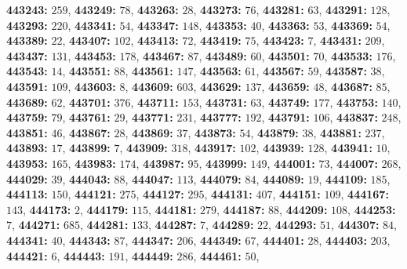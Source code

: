 \textsf{\bfseries 443243:} $259$, \textsf{\bfseries 443249:} $78$, \textsf{\bfseries 443263:} $28$, \textsf{\bfseries 443273:} $76$, \textsf{\bfseries 443281:} $63$, \textsf{\bfseries 443291:} $128$, \textsf{\bfseries 443293:} $220$, \textsf{\bfseries 443341:} $54$, \textsf{\bfseries 443347:} $148$, \textsf{\bfseries 443353:} $40$, \textsf{\bfseries 443363:} $53$, \textsf{\bfseries 443369:} $54$, \textsf{\bfseries 443389:} $22$, \textsf{\bfseries 443407:} $102$, \textsf{\bfseries 443413:} $72$, \textsf{\bfseries 443419:} $75$, \textsf{\bfseries 443423:} $7$, \textsf{\bfseries 443431:} $209$, \textsf{\bfseries 443437:} $131$, \textsf{\bfseries 443453:} $178$, \textsf{\bfseries 443467:} $87$, \textsf{\bfseries 443489:} $60$, \textsf{\bfseries 443501:} $70$, \textsf{\bfseries 443533:} $176$, \textsf{\bfseries 443543:} $14$, \textsf{\bfseries 443551:} $88$, \textsf{\bfseries 443561:} $147$, \textsf{\bfseries 443563:} $61$, \textsf{\bfseries 443567:} $59$, \textsf{\bfseries 443587:} $38$, \textsf{\bfseries 443591:} $109$, \textsf{\bfseries 443603:} $8$, \textsf{\bfseries 443609:} $603$, \textsf{\bfseries 443629:} $137$, \textsf{\bfseries 443659:} $48$, \textsf{\bfseries 443687:} $85$, \textsf{\bfseries 443689:} $62$, \textsf{\bfseries 443701:} $376$, \textsf{\bfseries 443711:} $153$, \textsf{\bfseries 443731:} $63$, \textsf{\bfseries 443749:} $177$, \textsf{\bfseries 443753:} $140$, \textsf{\bfseries 443759:} $79$, \textsf{\bfseries 443761:} $29$, \textsf{\bfseries 443771:} $231$, \textsf{\bfseries 443777:} $192$, \textsf{\bfseries 443791:} $106$, \textsf{\bfseries 443837:} $248$, \textsf{\bfseries 443851:} $46$, \textsf{\bfseries 443867:} $28$, \textsf{\bfseries 443869:} $37$, \textsf{\bfseries 443873:} $54$, \textsf{\bfseries 443879:} $38$, \textsf{\bfseries 443881:} $237$, \textsf{\bfseries 443893:} $17$, \textsf{\bfseries 443899:} $7$, \textsf{\bfseries 443909:} $318$, \textsf{\bfseries 443917:} $102$, \textsf{\bfseries 443939:} $128$, \textsf{\bfseries 443941:} $10$, \textsf{\bfseries 443953:} $165$, \textsf{\bfseries 443983:} $174$, \textsf{\bfseries 443987:} $95$, \textsf{\bfseries 443999:} $149$, \textsf{\bfseries 444001:} $73$, \textsf{\bfseries 444007:} $268$, \textsf{\bfseries 444029:} $39$, \textsf{\bfseries 444043:} $88$, \textsf{\bfseries 444047:} $113$, \textsf{\bfseries 444079:} $84$, \textsf{\bfseries 444089:} $19$, \textsf{\bfseries 444109:} $185$, \textsf{\bfseries 444113:} $150$, \textsf{\bfseries 444121:} $275$, \textsf{\bfseries 444127:} $295$, \textsf{\bfseries 444131:} $407$, \textsf{\bfseries 444151:} $109$, \textsf{\bfseries 444167:} $143$, \textsf{\bfseries 444173:} $2$, \textsf{\bfseries 444179:} $115$, \textsf{\bfseries 444181:} $279$, \textsf{\bfseries 444187:} $88$, \textsf{\bfseries 444209:} $108$, \textsf{\bfseries 444253:} $7$, \textsf{\bfseries 444271:} $685$, \textsf{\bfseries 444281:} $133$, \textsf{\bfseries 444287:} $7$, \textsf{\bfseries 444289:} $22$, \textsf{\bfseries 444293:} $51$, \textsf{\bfseries 444307:} $84$, \textsf{\bfseries 444341:} $40$, \textsf{\bfseries 444343:} $87$, \textsf{\bfseries 444347:} $206$, \textsf{\bfseries 444349:} $67$, \textsf{\bfseries 444401:} $28$, \textsf{\bfseries 444403:} $203$, \textsf{\bfseries 444421:} $6$, \textsf{\bfseries 444443:} $191$, \textsf{\bfseries 444449:} $286$, \textsf{\bfseries 444461:} $50$, 
